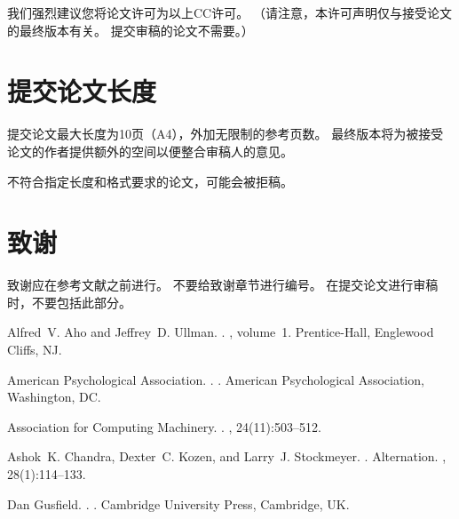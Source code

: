 \documentclass[11pt]{article}
\begin{document}
\begin{CJK*}{UTF8}{gbsn}
我们强烈建议您将论文许可为以上CC许可。 （请注意，本许可声明仅与接受论文的最终版本有关。
提交审稿的论文不需要。）

\section{提交论文长度}
\label{sec:length}

提交论文最大长度为10页（A4），外加无限制的参考页数。
最终版本将为被接受论文的作者提供额外的空间以便整合审稿人的意见。

不符合指定长度和格式要求的论文，可能会被拒稿。

\section*{致谢}

致谢应在参考文献之前进行。
不要给致谢章节进行编号。
在提交论文进行审稿时，不要包括此部分。

%
%

\begin{thebibliography}{}

Alfred~V. Aho and Jeffrey~D. Ullman.
.
, volume~1.
\newblock Prentice-{Hall}, Englewood Cliffs, NJ.

{American Psychological Association}.
.
.
\newblock American Psychological Association, Washington, DC.

{Association for Computing Machinery}.
.
, 24(11):503--512.

Ashok~K. Chandra, Dexter~C. Kozen, and Larry~J. Stockmeyer.
.
\newblock Alternation.
,
  28(1):114--133.

Dan Gusfield.
.
.
\newblock Cambridge University Press, Cambridge, UK.

\end{thebibliography}

\end{CJK*}
\end{document}

